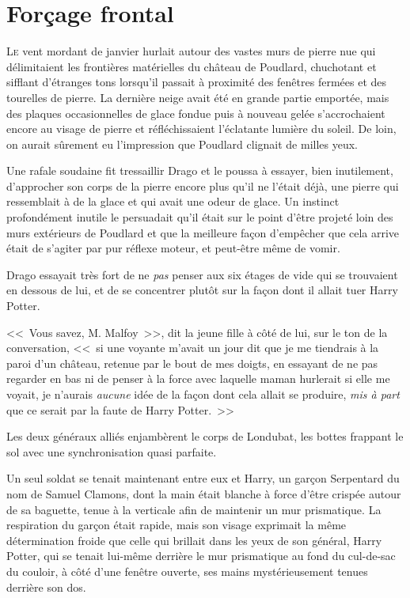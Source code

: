 \chapter{Forçage frontal}

\lettrine{L}{e} vent mordant de janvier hurlait autour des vastes murs de pierre nue qui délimitaient les frontières matérielles du château de Poudlard, chuchotant et sifflant d'étranges tons lorsqu'il passait à proximité des fenêtres fermées et des tourelles de pierre. La dernière neige avait été en grande partie emportée, mais des plaques occasionnelles de glace fondue puis à nouveau gelée s'accrochaient encore au visage de pierre et réfléchissaient l'éclatante lumière du soleil. De loin, on aurait sûrement eu l'impression que Poudlard clignait de milles yeux.

Une rafale soudaine fit tressaillir Drago et le poussa à essayer, bien inutilement, d'approcher son corps de la pierre encore plus qu'il ne l'était déjà, une pierre qui ressemblait à de la glace et qui avait une odeur de glace. Un instinct profondément inutile le persuadait qu'il était sur le point d'être projeté loin des murs extérieurs de Poudlard et que la meilleure façon d'empêcher que cela arrive était de s'agiter par pur réflexe moteur, et peut-être même de vomir.

Drago essayait très fort de ne \emph{pas} penser aux six étages de vide qui se trouvaient en dessous de lui, et de se concentrer plutôt sur la façon dont il allait tuer Harry Potter.

<<~Vous savez, M. Malfoy~>>, dit la jeune fille à côté de lui, sur le ton de la conversation, <<~si une voyante m'avait un jour dit que je me tiendrais à la paroi d'un château, retenue par le bout de mes doigts, en essayant de ne pas regarder en bas ni de penser à la force avec laquelle maman hurlerait si elle me voyait, je n'aurais \emph{aucune} idée de la façon dont cela allait se produire, \emph{mis à part} que ce serait par la faute de Harry Potter.~>>


Les deux généraux alliés enjambèrent le corps de Londubat, les bottes frappant le sol avec une synchronisation quasi parfaite.

Un seul soldat se tenait maintenant entre eux et Harry, un garçon Serpentard du nom de Samuel Clamons, dont la main était blanche à force d'être crispée autour de sa baguette, tenue à la verticale afin de maintenir un mur prismatique. La respiration du garçon était rapide, mais son visage exprimait la même détermination froide que celle qui brillait dans les yeux de son général, Harry Potter, qui se tenait lui-même derrière le mur prismatique au fond du cul-de-sac du couloir, à côté d'une fenêtre ouverte, ses mains mystérieusement tenues derrière son dos.

